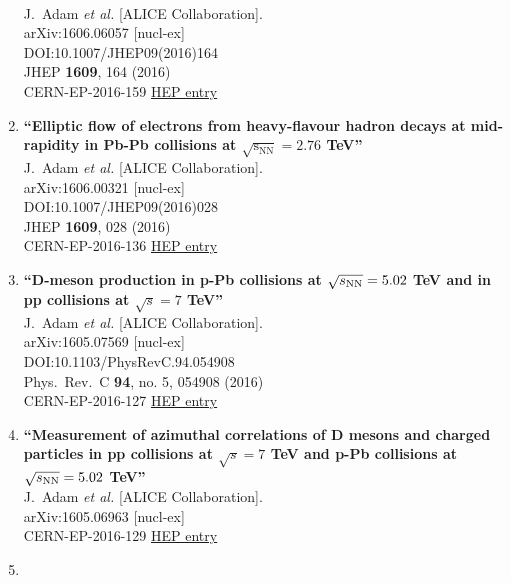 \begin{enumerate}
  \\{}J.~Adam {\it et al.} [ALICE Collaboration].
  \\{}arXiv:1606.06057 [nucl-ex]
  \\{}DOI:10.1007/JHEP09(2016)164
  \\{}JHEP {\bf 1609}, 164 (2016)
  \\{}CERN-EP-2016-159
\href{http://inspirehep.net/record/1471285}{HEP entry}
\item%
{\bf ``Elliptic flow of electrons from heavy-flavour hadron decays at mid-rapidity in Pb-Pb collisions at $ \sqrt{{\mathrm{s}}_{\mathrm{NN}}}=2.76 $ TeV''}
  \\{}J.~Adam {\it et al.} [ALICE Collaboration].
  \\{}arXiv:1606.00321 [nucl-ex]
  \\{}DOI:10.1007/JHEP09(2016)028
  \\{}JHEP {\bf 1609}, 028 (2016)
  \\{}CERN-EP-2016-136
\href{http://inspirehep.net/record/1466626}{HEP entry}
\item%
{\bf ``D-meson production in p-Pb collisions at $\sqrt{s_{\rm NN}}=5.02$ TeV and in pp collisions at $\sqrt{s}=7$ TeV''}
  \\{}J.~Adam {\it et al.} [ALICE Collaboration].
  \\{}arXiv:1605.07569 [nucl-ex]
  \\{}DOI:10.1103/PhysRevC.94.054908
  \\{}Phys.\ Rev.\ C {\bf 94}, no. 5, 054908 (2016)
  \\{}CERN-EP-2016-127
\href{http://inspirehep.net/record/1465513}{HEP entry}
\item%
{\bf ``Measurement of azimuthal correlations of D mesons and charged particles in pp collisions at $\sqrt{s}=7$ TeV and p-Pb collisions at $\sqrt{s_{\rm NN}}=5.02$ TeV''}
  \\{}J.~Adam {\it et al.} [ALICE Collaboration].
  \\{}arXiv:1605.06963 [nucl-ex]
  \\{}CERN-EP-2016-129
\href{http://inspirehep.net/record/1464839}{HEP entry}
\item%

\end{enumerate}
